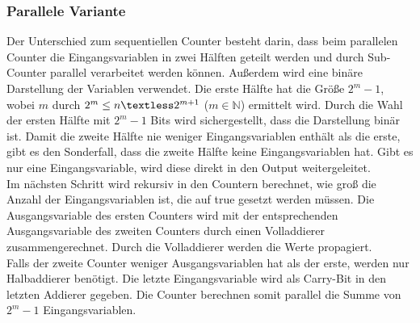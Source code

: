 \documentclass[a4,abstract=on]{scrartcl}
\begin{document}
		\subsubsection{Parallele Variante}
Der Unterschied zum sequentiellen Counter besteht darin, dass beim parallelen Counter die Eingangsvariablen in zwei Hälften geteilt werden und durch Sub-Counter parallel verarbeitet werden können. Außerdem wird eine binäre Darstellung der Variablen verwendet. Die erste Hälfte hat die Größe $2^{m}-1$, wobei $m$ durch $2^m \leq n \textless 2^{m+1}$ ($m \in \mathbb{N}$) ermittelt wird. Durch die Wahl der ersten Hälfte mit $2^{m}-1$ Bits wird sichergestellt, dass die Darstellung binär ist. Damit die zweite Hälfte nie weniger Eingangsvariablen enthält als die erste, gibt es den Sonderfall, dass die zweite Hälfte keine Eingangsvariablen hat. Gibt es nur eine Eingangsvariable, wird diese direkt in den Output weitergeleitet.\\
Im nächsten Schritt wird rekursiv in den Countern berechnet, wie groß die Anzahl der Eingangsvariablen ist, die auf true gesetzt werden müssen. Die Ausgangsvariable des ersten Counters wird mit der entsprechenden Ausgangsvariable des zweiten Counters durch einen Volladdierer zusammengerechnet. Durch die Volladdierer werden die Werte propagiert.\\
Falls der zweite Counter weniger Ausgangsvariablen hat als der erste, werden nur Halbaddierer benötigt. Die letzte Eingangsvariable wird als Carry-Bit in den letzten Addierer gegeben. Die Counter berechnen somit parallel die Summe von $2^m-1$ Eingangsvariablen.\\
\end{document}
